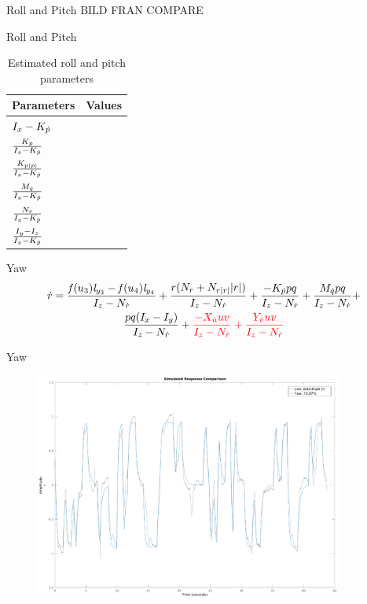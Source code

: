 \documentclass[11pt]{beamer}
\begin{document}
\begin{frame}{Roll and Pitch}
BILD FRAN COMPARE
\end{frame}

\begin{frame}{Roll and Pitch}
\begin{table}
\begin{tabular}{l l}
\toprule
\textbf{Parameters} & \textbf{Values}\\
\midrule
$I_{x} - K_{\dot{p}}$ 						& 	\\
$\frac{K_{p}}{I_{x} - K_{\dot{p}}}$ 			& 	\\
$\frac{K_{p|p|}}{I_{x} - K_{\dot{p}}}$ 		&	\\
$\frac{M_{\dot{q}}}{I_{x} - K_{\dot{p}}}$ 		&  	\\
$\frac{N_{\dot{r}}}{I_{x} - K_{\dot{p}}}$ 		& 	\\
$\frac{I_{y} - I_{z}}{I_{x} - K_{\dot{p}}}$ 	&  	\\
\bottomrule
\end{tabular}
\caption{Estimated roll and pitch parameters}
\end{table}
\end{frame}

\begin{frame}{Yaw}
\begin{multline*}
\dot{r} = \frac{\mathit{f}(u_{3}) \mathit{l}_{y_{3}} - \mathit{f}(u_{4}) \mathit{l}_{y_{4}}}{I_{z} - N_{\dot{r}}} + \frac{r (N_{r} + N_{r|r|} |r|)}{I_{z} - N_{\dot{r}}} + \frac{-K_{\dot{p}} p q}{I_{z} - N_{\dot{r}}} + \frac{M_{\dot{q}} p q}{I_{z} - N_{\dot{r}}} +\\
\frac{p q (I_{x} - I_{y})}{I_{z} - N_{\dot{r}}} + \textcolor{red}{\frac{- X_{\dot{u}} u v}{I_{z} - N_{\dot{r}}} + \frac{Y_{\dot{v}} u v}{I_{z} - N_{\dot{r}}}}
\end{multline*} 
\end{frame}

\begin{frame}{Yaw}
\begin{figure}
\includegraphics[width=0.9\textwidth]{fig/compareYaw}
\end{figure}
\end{frame}
\end{document}
